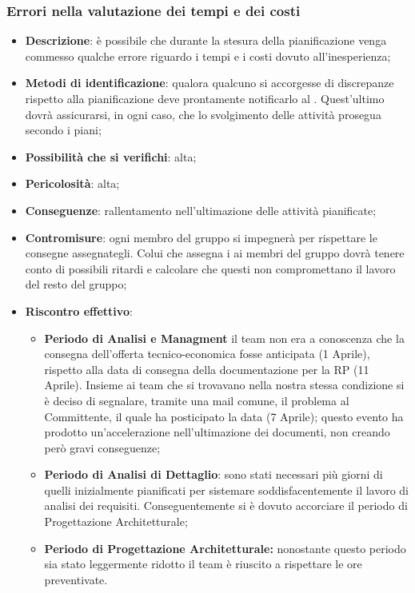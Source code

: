 		\subsubsection{Errori nella valutazione dei tempi e dei costi}
		\begin{itemize}
			\item \textbf{Descrizione}: è possibile che durante la stesura della pianificazione venga commesso qualche errore riguardo i tempi e i costi dovuto all'inesperienza;
			\item \textbf{Metodi di identificazione}: qualora qualcuno si accorgesse di discrepanze rispetto alla pianificazione deve prontamente notificarlo al \RES{}. Quest'ultimo dovrà assicurarsi, in ogni caso, che lo svolgimento delle attività prosegua secondo i piani; 
			\item \textbf{Possibilità che si verifichi}: alta;
			\item \textbf{Pericolosità}: alta;
			\item \textbf{Conseguenze}: rallentamento nell'ultimazione delle attività pianificate;
			\item \textbf{Contromisure}: ogni membro del gruppo si impegnerà per rispettare le consegne assegnategli. Colui che assegna i  ai membri del gruppo dovrà tenere conto di possibili ritardi e calcolare che questi non compromettano il lavoro del resto del gruppo; 
			\item \textbf{Riscontro effettivo}:
			\begin{itemize}
				 \item \textbf{Periodo di Analisi e Managment} il team non era a conoscenza che la consegna dell'offerta tecnico-economica fosse anticipata (1 Aprile), rispetto alla data di consegna della documentazione per la RP (11 Aprile). Insieme ai team che si trovavano nella nostra stessa condizione si è deciso di segnalare, tramite una mail comune, il problema al Committente, il quale ha posticipato la data (7 Aprile); questo evento ha prodotto un'accelerazione nell'ultimazione dei documenti, non creando però gravi conseguenze;
				 \item \textbf{Periodo di Analisi di Dettaglio}: sono stati necessari più giorni di quelli inizialmente pianificati per sistemare soddisfacentemente il lavoro di analisi dei requisiti. Conseguentemente si è dovuto accorciare il periodo di Progettazione Architetturale;
				 \item \textbf{Periodo di Progettazione Architetturale:} nonostante questo periodo sia stato leggermente ridotto il team è riuscito a rispettare le ore preventivate.
			\end{itemize}
		\end{itemize}
		
